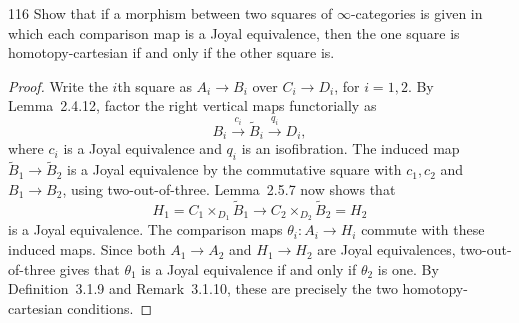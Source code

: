 \begin{exercise}{116}
Show that if a morphism between two squares of $\infty$-categories is given in
which each comparison map is a Joyal equivalence, then the one square is homotopy-cartesian if and only if the other square is.

\begin{proof}
Write the $i$th square as $A_i\to B_i$ over $C_i\to D_i$, for $i=1,2$.
By Lemma~2.4.12, factor the right vertical maps functorially as
\[
 B_i\xrightarrow{c_i}\widetilde B_i\xrightarrow{q_i}D_i,
\]
where $c_i$ is a Joyal equivalence and $q_i$ is an isofibration.
The induced map $\widetilde B_1\to\widetilde B_2$ is a Joyal equivalence
by the commutative square with $c_1,c_2$ and $B_1\to B_2$, using two-out-of-three.
Lemma~2.5.7 now shows that
\[
 H_1=C_1\times_{D_1}\widetilde B_1
 \longrightarrow C_2\times_{D_2}\widetilde B_2=H_2
\]
is a Joyal equivalence.
The comparison maps $\theta_i\colon A_i\to H_i$ commute with these induced maps.
Since both $A_1\to A_2$ and $H_1\to H_2$ are Joyal equivalences,
two-out-of-three gives that $\theta_1$ is a Joyal equivalence if and only if
$\theta_2$ is one.
By Definition~3.1.9 and Remark~3.1.10, these are precisely the two
homotopy-cartesian conditions.
\end{proof}
\end{exercise}
